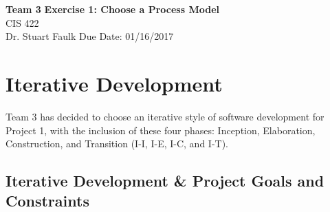 \documentclass[a4paper, 11pt]{article}
\begin{document}
\noindent
\large\textbf{Team 3} \hfill \textbf{Exercise 1: Choose a Process Model} \\
\normalsize CIS 422 \hfill  \\
Dr. Stuart Faulk  \hfill Due Date: 01/16/2017

\section{Iterative Development}
Team 3 has decided to choose an iterative style of software development for Project 1, with the inclusion of these four phases: Inception, Elaboration, Construction, and Transition (I-I, I-E, I-C, and I-T).

\subsection{Iterative Development \& Project Goals and Constraints}
\end{document}
